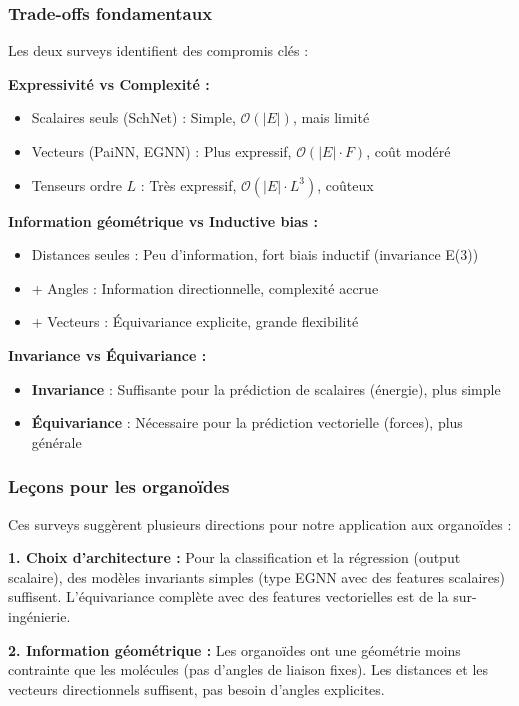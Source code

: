 \subsubsection{Trade-offs fondamentaux}

Les deux surveys identifient des compromis clés :

\textbf{Expressivité vs Complexité :}
\begin{itemize}
    \item Scalaires seuls (SchNet) : Simple, $\mathcal{O}(|E|)$, mais limité
    \item Vecteurs (PaiNN, EGNN) : Plus expressif, $\mathcal{O}(|E| \cdot F)$, coût modéré
    \item Tenseurs ordre $L$ : Très expressif, $\mathcal{O}(|E| \cdot L^3)$, coûteux
\end{itemize}

\textbf{Information géométrique vs Inductive bias :}
\begin{itemize}
    \item Distances seules : Peu d'information, fort biais inductif (invariance E(3))
    \item + Angles : Information directionnelle, complexité accrue
    \item + Vecteurs : Équivariance explicite, grande flexibilité
\end{itemize}

\textbf{Invariance vs Équivariance :}
\begin{itemize}
    \item \textbf{Invariance} : Suffisante pour la prédiction de scalaires (énergie), plus simple
    \item \textbf{Équivariance} : Nécessaire pour la prédiction vectorielle (forces), plus générale
\end{itemize}

\subsubsection{Leçons pour les organoïdes}

Ces surveys suggèrent plusieurs directions pour notre application aux organoïdes :

\textbf{1. Choix d'architecture :}
Pour la classification et la régression (output scalaire), des modèles invariants simples (type EGNN avec des features scalaires) suffisent. L'équivariance complète avec des features vectorielles est de la sur-ingénierie.

\textbf{2. Information géométrique :}
Les organoïdes ont une géométrie moins contrainte que les molécules (pas d'angles de liaison fixes). Les distances et les vecteurs directionnels suffisent, pas besoin d'angles explicites.

